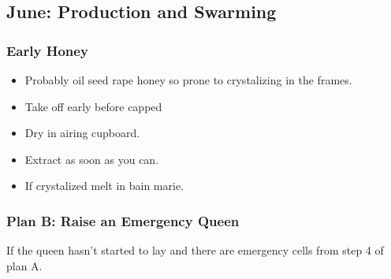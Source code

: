 \subsection{June: Production and Swarming}

\subsubsection{Early Honey}

\begin{itemize}
    \item Probably oil seed rape honey so prone to crystalizing in the frames.
    \item Take off early before capped
    \item Dry in airing cupboard.
    \item Extract as soon as you can.
    \item If crystalized melt in bain marie.
\end{itemize}


\subsubsection{Plan B: Raise an Emergency Queen}

If the queen hasn't started to lay and there are emergency cells from step 4 of plan A.




